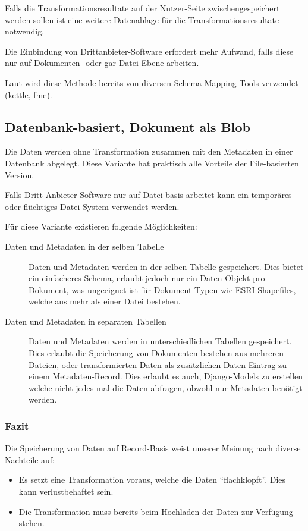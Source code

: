 Falls die Transformationsresultate auf der Nutzer-Seite zwischengespeichert werden sollen ist eine weitere Datenablage für die Transformationsresultate notwendig.

Die Einbindung von Drittanbieter-Software erfordert mehr Aufwand, falls diese nur auf Dokumenten- oder gar Datei-Ebene arbeiten.

Laut \prof wird diese Methode bereits von diversen Schema Mapping-Tools verwendet (\gls{kettle}, \gls{fme}).

\subsection{Datenbank-basiert, Dokument als Blob}
Die Daten werden ohne Transformation zusammen mit den Metadaten in einer Datenbank abgelegt. Diese Variante hat praktisch alle Vorteile der File-basierten Version.

Falls Dritt-Anbieter-Software nur auf Datei-basis arbeitet kann ein temporäres oder flüchtiges Datei-System verwendet werden.

Für diese Variante existieren folgende Möglichkeiten:
\begin{description}
\item[Daten und Metadaten in der selben Tabelle] Daten und Metadaten werden in der selben Tabelle gespeichert. Dies bietet ein einfacheres Schema, erlaubt jedoch nur ein Daten-Objekt pro Dokument, was ungeeignet ist für Dokument-Typen wie ESRI Shapefiles, welche aus mehr als einer Datei bestehen.
\item[Daten und Metadaten in separaten Tabellen] Daten und Metadaten werden in unterschiedlichen Tabellen gespeichert. Dies erlaubt die Speicherung von Dokumenten bestehen aus mehreren Dateien, oder transformierten Daten als zusätzlichen Daten-Eintrag zu einem Metadaten-Record. Dies erlaubt es auch, Django-Models zu erstellen welche nicht jedes mal die Daten abfragen, obwohl nur Metadaten benötigt werden.
\end{description}

\subsubsection{Fazit}
Die Speicherung von Daten auf Record-Basis weist unserer Meinung nach diverse Nachteile auf: 
\begin{itemize}
\item Es setzt eine Transformation voraus, welche die Daten ``flachklopft''. Dies kann verlustbehaftet sein.
\item Die Transformation muss bereits beim Hochladen der Daten zur Verfügung stehen.
\end{itemize}

